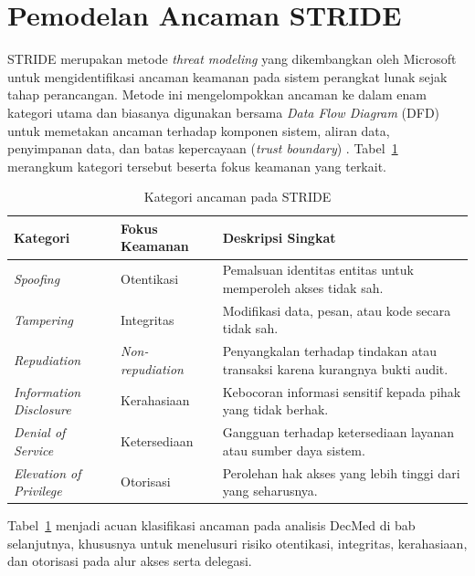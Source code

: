 \section{Pemodelan Ancaman STRIDE}
\label{sec:stride}

STRIDE merupakan metode \textit{threat modeling} yang dikembangkan oleh Microsoft untuk mengidentifikasi ancaman keamanan pada sistem perangkat lunak sejak tahap perancangan. Metode ini mengelompokkan ancaman ke dalam enam kategori utama dan biasanya digunakan bersama \textit{Data Flow Diagram} (DFD) untuk memetakan ancaman terhadap komponen sistem, aliran data, penyimpanan data, dan batas kepercayaan (\textit{trust boundary}) \autocite{shostack2014threatmodeling,microsoft2006msdnstride}. Tabel~\ref{tab:stride-components} merangkum kategori tersebut beserta fokus keamanan yang terkait.

\begin{table}[H]
	\centering
	\caption{Kategori ancaman pada STRIDE}
	\label{tab:stride-components}
	\begin{tabularx}{\textwidth}{|l|l|X|}
		\hline
		\textbf{Kategori}               & \textbf{Fokus Keamanan} & \textbf{Deskripsi Singkat} \\
		\hline
		\textit{Spoofing}               &
		Otentikasi                      &
		Pemalsuan identitas entitas untuk memperoleh akses tidak sah.                          \\
		\hline

		\textit{Tampering}              &
		Integritas                      &
		Modifikasi data, pesan, atau kode secara tidak sah.                                    \\
		\hline

		\textit{Repudiation}            &
		\textit{Non-repudiation}        &
		Penyangkalan terhadap tindakan atau transaksi karena kurangnya bukti audit.            \\
		\hline

		\textit{Information Disclosure} &
		Kerahasiaan                     &
		Kebocoran informasi sensitif kepada pihak yang tidak berhak.                           \\
		\hline

		\textit{Denial of Service}      &
		Ketersediaan                    &
		Gangguan terhadap ketersediaan layanan atau sumber daya sistem.                        \\
		\hline

		\textit{Elevation of Privilege} &
		Otorisasi                       &
		Perolehan hak akses yang lebih tinggi dari yang seharusnya.                            \\
		\hline
	\end{tabularx}
\end{table}

Tabel~\ref{tab:stride-components} menjadi acuan klasifikasi ancaman pada analisis DecMed di bab selanjutnya, khususnya untuk menelusuri risiko otentikasi, integritas, kerahasiaan, dan otorisasi pada alur akses serta delegasi.
